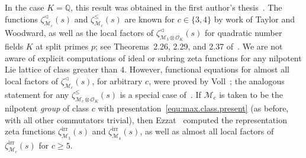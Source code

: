 \documentclass[11pt,a4paper]{amsart}
\theoremstyle{plain}
\theoremstyle{remark}
\newcommand{\Q}{\mathbb{Q}}
\newcommand{\tensor}{\otimes}
\begin{document}
In the case $K = \Q$, this result was obtained in the first author's thesis~\cite[Section 3.3.1]{Berman/05}.  The functions $\zeta^\vartriangleleft_{\mathcal{M}_c}(s)$ and $\zeta^\leq_{\mathcal{M}_c}(s)$ are known for $c \in \{ 3, 4 \}$ by work of Taylor and Woodward, as well as the local factors of $\zeta^\vartriangleleft_{\mathcal{M}_3 \tensor \mathcal{O}_K}(s)$ for quadratic number fields $K$ at split primes $p$; see Theorems~2.26, 2.29, and 2.37 of~\cite{duSWoodward/08}.  We are not aware of explicit computations of ideal or subring zeta functions for any nilpotent Lie lattice of class greater than $4$.  However, functional equations for almost all local factors of $\zeta^\vartriangleleft_{\mathcal{M}_c}(s)$, for arbitrary $c$, were proved by Voll~\cite[Theorem~4.8]{Voll/17}; the analogous statement for any $\zeta^\leq_{\mathcal{M}_c \tensor \mathcal{O}_K}(s)$ is a special case of~\cite[Corollary~1.1]{Voll/10}.  If $\mathcal{M}_c$ is taken to be the nilpotent {\emph{group}} of class $c$ with presentation~\eqref{equ:max.class.present} (as before, with all other commutators trivial), then Ezzat~\cite{Ezzat/nexc, Ezzat/exc} computed the representation zeta functions $\zeta^{\mathrm{irr}}_{\mathcal{M}_3}(s)$ and $\zeta^{\mathrm{irr}}_{\mathcal{M}_4}(s)$, as well as almost all local factors of $\zeta^{\mathrm{irr}}_{\mathcal{M}_c}(s)$ for $c \geq 5$.
\end{document}

